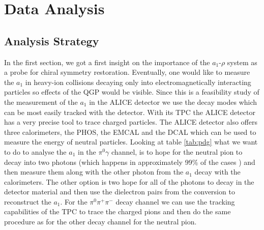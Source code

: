 \section{Data Analysis}
\label{sec:Analysis}
\subsection{Analysis Strategy}
\begin{table}[b]
\caption{Decay modes of the $a_1$ meson and control modes $\omega,\eta$ and $\rho$ \cite{PDG2018}}
\label{tab:pdg}
\end{table}
In the first section, we got a first insight on the importance of the $a_1$-$\rho$ system as a probe for chiral symmetry restoration. Eventually, one would like to measure the $a_1$ in heavy-ion collisions decaying only into electromagnetically interacting particles so effects of the QGP would be visible. Since this is a feasibility study of the measurement of the $a_1$ in the ALICE detector we use the decay modes which can be most easily tracked with the detector. With its TPC the ALICE detector has a very precise tool to trace charged particles. The ALICE detector also offers three calorimeters, the PHOS, the EMCAL and the DCAL which can be used to measure the energy of neutral particles. Looking at table \ref{tab:pdg} what we want to do to analyse the $a_1$ in the $\pi^0 \gamma$ channel, is to hope for the neutral pion to decay into two photons (which happens in approximately 99\% of the cases \cite{PDG2018}) and then measure them along with the other photon from the $a_1$ decay with the calorimeters. The other option is two hope for all of the photons to decay in the detector material and then use the dielectron pairs from the conversion to reconstruct the $a_1$. For the $\pi^0 \pi^{+}\pi^{-}$ decay channel we can use the tracking capabilities of the TPC to trace the charged pions and then do the same procedure as for the other decay channel for the neutral pion. \\
